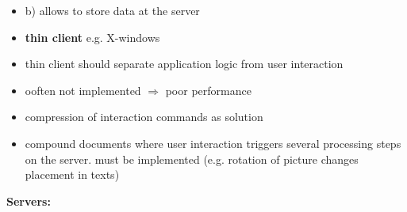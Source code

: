 \documentclass[ngerman,a4paper]{report}
\begin{document}
\begin{itemize}
\item b) allows to store data at the server
\item \textbf{thin client} e.g. X-windows
\item thin client should separate application logic from user interaction
\item ooften not implemented $\Rightarrow$ poor performance
\item compression of interaction commands as solution
\item compound documents where user interaction triggers several processing steps on the server. must be implemented (e.g. rotation of picture changes placement in texts)
\end{itemize}

\textbf{Servers:}\\
\end{document}
